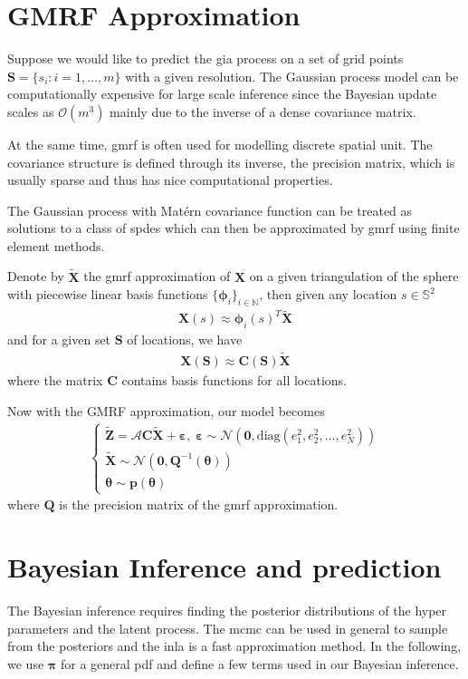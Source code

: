 \documentclass[a4paper,12pt]{article}
\begin{document}
\section{GMRF Approximation}
Suppose we would like to predict the \acrshort{gia} process on a set of grid points $\bm{S} = \{s_i: i = 1,\dots, m\}$ with a given resolution. The Gaussian process model can be computationally expensive for large scale inference since the Bayesian update scales as $\mathcal{O}(m^3)$ mainly due to the inverse of a dense covariance matrix. 

At the same time, \acrlong{gmrf} is often used for modelling discrete spatial unit. The covariance structure is defined through its inverse, the precision matrix, which is usually sparse and thus has nice computational properties.

The Gaussian process with Mat\'{e}rn covariance function can be treated as solutions to a class of \acrlong{spde}s \citep{Lindgren2011} which can then be approximated by \acrshort{gmrf} using finite element methods. 

Denote by $\bm{\tilde{X}}$ the \acrshort{gmrf} approximation of $\bm{X}$ on a given triangulation of the sphere with piecewise linear basis functions $\{ \bm{\phi}_i \}_{i \in \mathbb{N}}$, then given any location $s \in \mathbb{S}^2$
\begin{align}
\bm{X}(s) \approx \bm{\phi}_i(s)^T\bm{\tilde{X}}
\end{align}
and for a given set $\bm{S}$ of locations, we have  
\begin{align}
\bm{X}(\bm{S}) \approx \bm{C}(\bm{S})\bm{\tilde{X}}
\end{align}
where the matrix $\bm{C}$ contains basis functions for all locations.

Now with the GMRF approximation, our model becomes
\begin{align}
\left\{ \begin{array}{l}
\bm{\tilde{Z}} = \bm{\mathcal{A}}\bm{C}\bm{\tilde{X}} + \bm{\varepsilon}, \; 
\bm{\varepsilon} \sim \mathcal{N} (\bm{0}, \mbox{diag}(e_1^2, e_2^2, \dots, e_N^2)) \\
\bm{\tilde{X}} \sim \mathcal{N}(\bm{0}, \bm{Q}^{-1}(\bm{\theta})) \\
\bm{\theta} \sim \bm{p}(\bm{\theta})
\end{array} \right.
\end{align}
where $\bm{Q}$ is the precision matrix of the \acrshort{gmrf} approximation.

\section{Bayesian Inference and prediction}
The Bayesian inference requires finding the posterior distributions of the hyper parameters and the latent process. The \acrfull{mcmc} can be used in general to sample from the posteriors and the \acrfull{inla} is a fast approximation method. In the following, we use $\bm{\pi}$ for a general \acrshort{pdf} and define a few terms used in our Bayesian inference.
\end{document}
